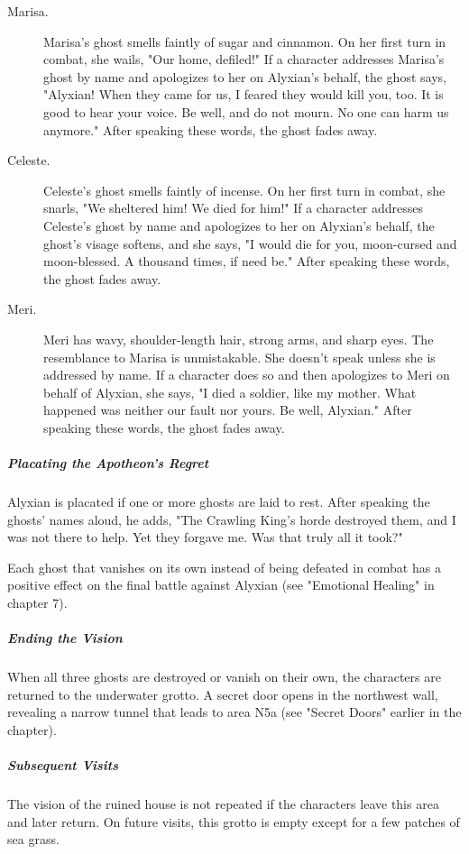 \documentclass[10pt,a4paper,twoside,fancy,bg=print,twocolumn,openany,nodeprecatedcode]{dndbook}
\begin{document}
\begin{description}
\item[Marisa.]
Marisa's ghost smells faintly of sugar and cinnamon. On her first turn in combat, she wails, "Our home, defiled!" If a character addresses Marisa's ghost by name and apologizes to her on Alyxian's behalf, the ghost says, "Alyxian! When they came for us, I feared they would kill you, too. It is good to hear your voice. Be well, and do not mourn. No one can harm us anymore." After speaking these words, the ghost fades away.

\item[Celeste.]
Celeste's ghost smells faintly of incense. On her first turn in combat, she snarls, "We sheltered him! We died for him!" If a character addresses Celeste's ghost by name and apologizes to her on Alyxian's behalf, the ghost's visage softens, and she says, "I would die for you, moon-cursed and moon-blessed. A thousand times, if need be." After speaking these words, the ghost fades away.

\item[Meri.]
Meri has wavy, shoulder-length hair, strong arms, and sharp eyes. The resemblance to Marisa is unmistakable. She doesn't speak unless she is addressed by name. If a character does so and then apologizes to Meri on behalf of Alyxian, she says, "I died a soldier, like my mother. What happened was neither our fault nor yours. Be well, Alyxian." After speaking these words, the ghost fades away.
\end{description}

\subparagraph{Placating the Apotheon's Regret}
Alyxian is placated if one or more ghosts are laid to rest. After speaking the ghosts' names aloud, he adds, "The Crawling King's horde destroyed them, and I was not there to help. Yet they forgave me. Was that truly all it took?"

Each ghost that vanishes on its own instead of being defeated in combat has a positive effect on the final battle against Alyxian (see "Emotional Healing" in chapter 7).

\subparagraph{Ending the Vision}
When all three ghosts are destroyed or vanish on their own, the characters are returned to the underwater grotto. A secret door opens in the northwest wall, revealing a narrow tunnel that leads to area N5a (see "Secret Doors" earlier in the chapter).

\subparagraph{Subsequent Visits}
The vision of the ruined house is not repeated if the characters leave this area and later return. On future visits, this grotto is empty except for a few patches of sea grass.
\end{document}
